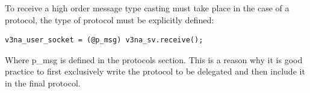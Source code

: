 \documentclass[a4paper]{easychair}
\begin{document}
To receive a high order message type casting must take place in the case of a protocol, the type of protocol must be explicitly defined:

\begin{lstlisting}
v3na_user_socket = (@p_msg) v3na_sv.receive();
\end{lstlisting}

Where p\_msg is defined in the protocols section. This is a reason why it is good practice to first exclusively write the protocol to be delegated and then include it in the final protocol.



%
\label{sect:bib}

%
%
%


\appendix




\end{document}
